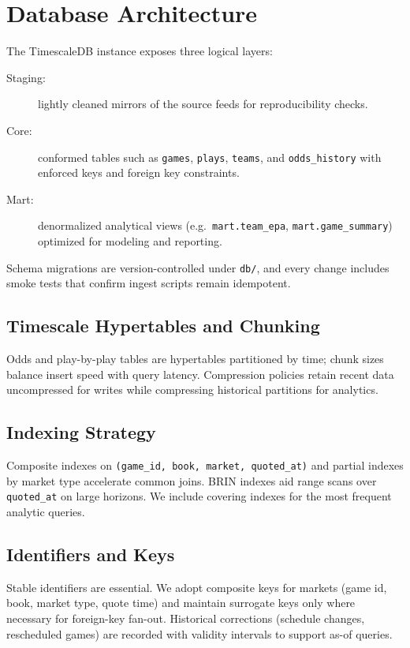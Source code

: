 \section{Database Architecture}\label{sec:schema-mart}
The TimescaleDB instance exposes three logical layers:
\begin{description}
  \item[Staging:] lightly cleaned mirrors of the source feeds for reproducibility checks.
  \item[Core:] conformed tables such as \texttt{games}, \texttt{plays}, \texttt{teams}, and \texttt{odds\_history} with enforced keys and foreign key constraints.
  \item[Mart:] denormalized analytical views (e.g.\ \texttt{mart.team\_epa}, \texttt{mart.game\_summary})\\ optimized for modeling and reporting.
\end{description}
Schema migrations are version-controlled under \texttt{db/}, and every change includes smoke tests that confirm ingest scripts remain idempotent.

\subsection{Timescale Hypertables and Chunking}
Odds and play-by-play tables are hypertables partitioned by time; chunk sizes balance insert speed with query latency. Compression policies retain recent data uncompressed for writes while compressing historical partitions for analytics.

\subsection{Indexing Strategy}
Composite indexes on \texttt{(game\_id, book, market, quoted\_at)} and partial indexes by market type accelerate common joins. BRIN indexes aid range scans over \texttt{quoted\_at} on large horizons. We include covering indexes for the most frequent analytic queries.

\subsection{Identifiers and Keys}
Stable identifiers are essential. We adopt composite keys for markets (game id, book, market type, quote time) and maintain surrogate keys only where necessary for foreign-key fan-out. Historical corrections (schedule changes, rescheduled games) are recorded with validity intervals to support as-of queries.

